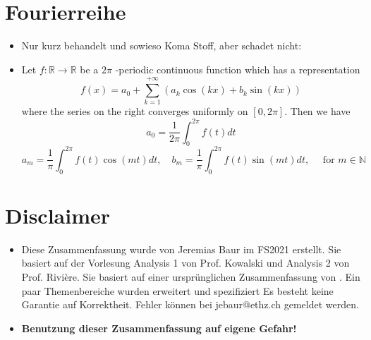 \documentclass[a3paper, 11pt, landscape]{scrartcl}
\begin{document}
\begin{multicols*}{3}
		\section{Fourierreihe}
		\begin{itemize}
		    \item Nur kurz behandelt und sowieso Koma Stoff, aber schadet nicht:
		    \item Let \(f: \mathbb{R} \rightarrow \mathbb{R}\) be a \(2 \pi\) -periodic continuous function which has a representation
$$
f(x)=a_{0}+\sum_{k=1}^{+\infty}\left(a_{k} \cos (k x)+b_{k} \sin (k x)\right)
$$
where the series on the right converges uniformly on \([0,2 \pi] .\) Then we have
$$a_{0} =\frac{1}{2 \pi} \int_{0}^{2 \pi} f(t) d t$$
$$
a_{m}=\frac{1}{\pi} \int_{0}^{2 \pi} f(t) \cos (m t) d t, \quad b_{m}=\frac{1}{\pi} \int_{0}^{2 \pi} f(t) \sin (m t) d t, \quad \text { for } m \in \mathbb{N}
$$
		\end{itemize}
		
	    \section{Disclaimer}
	    \begin{itemize}
	        \item Diese Zusammenfassung wurde von Jeremias Baur im FS2021 erstellt. Sie basiert auf der Vorlesung Analysis 1 von Prof. Kowalski und Analysis 2 von Prof. Rivière. Sie basiert auf einer ursprünglichen Zusammenfassung von . Ein paar Themenbereiche wurden
erweitert und spezifiziert Es besteht keine Garantie auf Korrektheit. Fehler können bei jebaur@ethz.ch gemeldet werden.
	        \item \textbf{Benutzung dieser Zusammenfassung auf eigene Gefahr!}
	    \end{itemize}
    \end{multicols*}
\setcounter{secnumdepth}{2}
\end{document}
